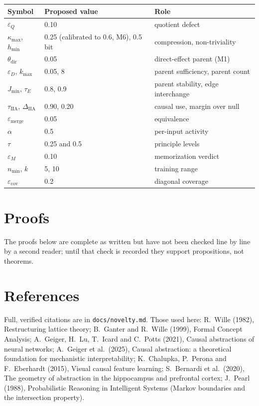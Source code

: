 \documentclass[11pt]{article}
\theoremstyle{definition}
\theoremstyle{plain}
\theoremstyle{remark}
\newcommand{\IIA}{\mathrm{IIA}}
\begin{document}
\begin{tabular}{lll}
\toprule
Symbol & Proposed value & Role \\
\midrule
$\varepsilon_Q$ & 0.10 & quotient defect \\
$\kappa_{\max}$, $h_{\min}$ & 0.25 (calibrated to 0.6, M6), 0.5 bit & compression, non-triviality \\
$\theta_{\mathrm{dir}}$ & 0.05 & direct-effect parent (M1) \\
$\varepsilon_D$, $k_{\max}$ & 0.05, 8 & parent sufficiency, parent count \\
$J_{\min}$, $\tau_E$ & 0.8, 0.9 & parent stability, edge interchange \\
$\tau_{\IIA}$, $\Delta_{\IIA}$ & 0.90, 0.20 & causal use, margin over null \\
$\varepsilon_{\mathrm{merge}}$ & 0.05 & equivalence \\
$\alpha$ & 0.5 & per-input activity \\
$\tau$ & 0.25 and 0.5 & principle levels \\
$\varepsilon_M$ & 0.10 & memorization verdict \\
$n_{\min}$, $k$ & 5, 10 & training range \\
$\varepsilon_{\mathrm{cov}}$ & 0.2 & diagonal coverage \\
\bottomrule
\end{tabular}

\appendix
\section{Proofs}
The proofs below are complete as written but have not been checked line by
line by a second reader; until that check is recorded they support
propositions, not theorems.











\section*{References}
Full, verified citations are in \texttt{docs/novelty.md}. Those used here:
R.~Wille (1982), Restructuring lattice theory; B.~Ganter and R.~Wille (1999),
Formal Concept Analysis; A.~Geiger, H.~Lu, T.~Icard and C.~Potts (2021),
Causal abstractions of neural networks; A.~Geiger et al.\ (2025), Causal
abstraction: a theoretical foundation for mechanistic interpretability;
K.~Chalupka, P.~Perona and F.~Eberhardt (2015), Visual causal feature
learning; S.~Bernardi et al.\ (2020), The geometry of abstraction in the
hippocampus and prefrontal cortex; J.~Pearl (1988), Probabilistic Reasoning
in Intelligent Systems (Markov boundaries and the intersection property).
\end{document}

